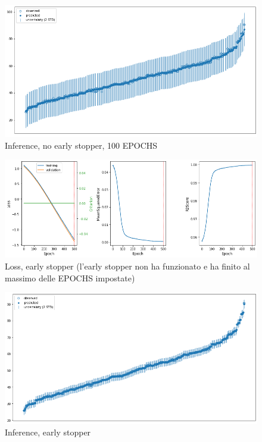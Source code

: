 \newpage
\begin{figure}[h]
    \centering
    \includegraphics[width=1\textwidth]{images/Training - temp/PP - inference.png}
    \caption{Inference, no early stopper, 100 EPOCHS}
\end{figure}


\newpage
\begin{figure}[h]
    \centering
    \includegraphics[width=1\textwidth]{images/Training - temp/PP - loss - early inference.png}
    \caption{Loss, early stopper (l'early stopper non ha funzionato e ha finito al massimo delle EPOCHS impostate)}
\end{figure}



\newpage
\begin{figure}[h]
    \centering
    \includegraphics[width=1\textwidth]{images/Training - temp/PP - inference - early stopper.png}
    \caption{Inference, early stopper}
\end{figure}


